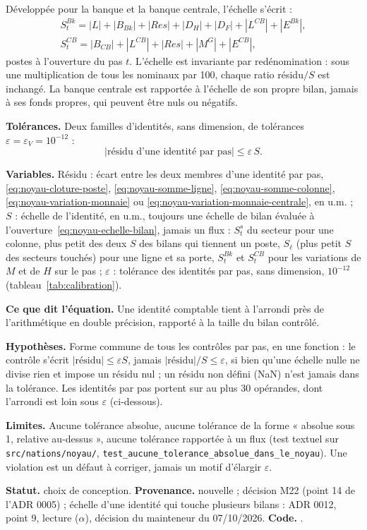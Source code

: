 \documentclass[11pt,a4paper]{article}
\newcommand{\variables}{\par\noindent\textbf{Variables.} }
\newcommand{\sens}{\par\noindent\textbf{Ce que dit l'équation.} }
\newcommand{\hyp}{\par\noindent\textbf{Hypothèses.} }
\newcommand{\limites}{\par\noindent\textbf{Limites.} }
\newcommand{\code}[1]{\texttt{\detokenize{#1}}}
\newcommand{\tracabilite}[3]{\par\smallskip\noindent\textbf{Statut.} #1. \textbf{Provenance.} #2. \textbf{Code.} \code{#3}.}
\begin{document}
Développée pour la banque et la banque centrale, l'échelle s'écrit :
\begin{gather*}
S^{\mathit{Bk}}_t = |L| + |B_{\mathit{Bk}}| + |\mathit{Res}| + |D_H| + |D_F| + |L^{\mathit{CB}}| + |E^{\mathit{Bk}}| , \\
S^{\mathit{CB}}_t = |B_{\mathit{CB}}| + |L^{\mathit{CB}}| + |\mathit{Res}| + |M^G| + |E^{\mathit{CB}}| ,
\end{gather*}
postes à l'ouverture du pas $t$. L'échelle est invariante par redénomination : sous une multiplication de tous les nominaux par 100, chaque ratio résidu$/S$ est inchangé. La banque centrale est rapportée à l'échelle de son propre bilan, jamais à ses fonds propres, qui peuvent être nuls ou négatifs.

\textbf{Tolérances.} Deux familles d'identités, sans dimension, de tolérances $\varepsilon = \varepsilon_V = 10^{-12}$ :
\begin{equation}\label{eq:noyau-tolerance-pas}
|\text{résidu d'une identité par pas}| \le \varepsilon\, S .
\end{equation}
\begin{lecture}
\variables Résidu : écart entre les deux membres d'une identité par pas, \eqref{eq:noyau-cloture-poste}, \eqref{eq:noyau-somme-ligne}, \eqref{eq:noyau-somme-colonne}, \eqref{eq:noyau-variation-monnaie} ou \eqref{eq:noyau-variation-monnaie-centrale}, en u.m. ; $S$ : échelle de l'identité, en u.m., toujours une échelle de bilan évaluée à l'ouverture~\eqref{eq:noyau-echelle-bilan}, jamais un flux : $S^s_t$ du secteur pour une colonne, plus petit des deux $S$ des bilans qui tiennent un poste, $S_\ell$ (plus petit $S$ des secteurs touchés) pour une ligne et sa porte, $S^{\mathit{Bk}}_t$ et $S^{\mathit{CB}}_t$ pour les variations de $M$ et de $H$ sur le pas ; $\varepsilon$ : tolérance des identités par pas, sans dimension, $10^{-12}$ (tableau~\ref{tab:calibration}).
\sens Une identité comptable tient à l'arrondi près de l'arithmétique en double précision, rapporté à la taille du bilan contrôlé.
\hyp Forme commune de tous les contrôles par pas, en une fonction : le contrôle s'écrit $|\text{résidu}| \le \varepsilon S$, jamais $|\text{résidu}|/S \le \varepsilon$, si bien qu'une échelle nulle ne divise rien et impose un résidu nul ; un résidu non défini (NaN) n'est jamais dans la tolérance. Les identités par pas portent sur au plus 30 opérandes, dont l'arrondi est loin sous $\varepsilon$ (ci-dessous).
\limites Aucune tolérance absolue, aucune tolérance de la forme « absolue sous 1, relative au-dessus », aucune tolérance rapportée à un flux (test textuel sur \nolinkurl{src/nations/noyau/}, \nolinkurl{test_aucune_tolerance_absolue_dans_le_noyau}). Une violation est un défaut à corriger, jamais un motif d'élargir $\varepsilon$.
\tracabilite{choix de conception}{nouvelle ; décision M22 (point 14 de l'ADR 0005) ; échelle d'une identité qui touche plusieurs bilans : ADR 0012, point 9, lecture ($\alpha$), décision du mainteneur du 07/10/2026}{nations.noyau.identites.dans_la_tolerance}
\end{lecture}
\end{document}
